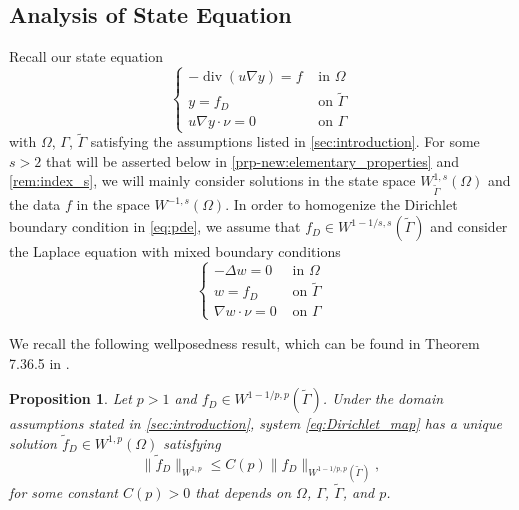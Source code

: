 \documentclass[11pt]{article}
\DeclareMathOperator*{\dvg}{div}
\newtheorem{proposition}[theorem]{Proposition}
\theoremstyle{definition}
\theoremstyle{remark}
\begin{document}
\subsection{Analysis of State Equation}\label{S2.1}
Recall our state equation
\begin{equation}\label{eq:pde}
\begin{cases}
    - \dvg(u \nabla y) = f & \text{ in } \Omega\\
y = f_D & \text{ on } \tilde{\Gamma}\\
u \nabla y \cdot \nu = 0 &\text{ on } \Gamma
\end{cases}
\end{equation}
with $\Omega$, $\Gamma$, $\tilde{\Gamma}$ satisfying the assumptions listed in  \cref{sec:introduction}. For some $s > 2$ that will be asserted below in \cref{prp-new:elementary_properties}
and \cref{rem:index_s}, we will mainly consider solutions
in the state space $W^{1,s}_{\tilde\Gamma}(\Omega)$ and the data $f$ in the
space $W^{-1,s}(\Omega)$. In order to homogenize the Dirichlet boundary condition in \eqref{eq:pde}, we assume that 
$f_D \in  W^{1-1/s,s}(\tilde{\Gamma})$ and consider the
Laplace equation with mixed boundary conditions 
\begin{equation}\label{eq:Dirichlet_map}
    \begin{cases}
     -\Delta w = 0 &\text{ in } \Omega \\
w = f_D &\text{ on } \tilde{\Gamma} \\
\nabla w \cdot \nu = 0 &\text{ on }\Gamma   
    \end{cases}
\end{equation}

We recall the following wellposedness result, which can be found in Theorem 7.36.5 in \cite{medkova2018laplace}.
\begin{proposition}\label{prp:Dirichlet_map}
Let $p > 1$ and $f_D \in W^{1-1/p,p}(\tilde{\Gamma})$.
Under the domain assumptions stated in
\cref{sec:introduction},
system
\eqref{eq:Dirichlet_map} has a unique solution $\tilde{f}_D \in W^{1,p}(\Omega)$ satisfying
\begin{equation}\label{est-eq_from19}
    \|\tilde{f}_D\|_{W^{1,p}}
   \le C(p) \|f_D\|_{W^{1-1/p,p}(\tilde\Gamma)},
\end{equation}
for some constant $C(p) > 0$ that depends on $\Omega$, $\Gamma$, $\tilde\Gamma$,
and $p$.
\end{proposition}
\end{document}

